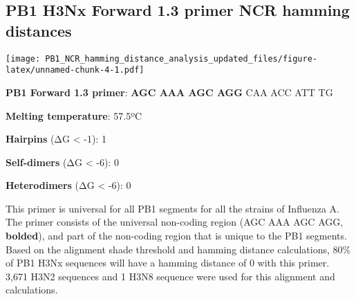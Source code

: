 \documentclass[
]{article}
\newenvironment{Shaded}{\begin{snugshade}}{\end{snugshade}}
\newcommand{\AttributeTok}[1]{\textcolor[rgb]{0.77,0.63,0.00}{#1}}
\newcommand{\DecValTok}[1]{\textcolor[rgb]{0.00,0.00,0.81}{#1}}
\newcommand{\FunctionTok}[1]{\textcolor[rgb]{0.00,0.00,0.00}{#1}}
\newcommand{\NormalTok}[1]{#1}
\newcommand{\OtherTok}[1]{\textcolor[rgb]{0.56,0.35,0.01}{#1}}
\newcommand{\SpecialCharTok}[1]{\textcolor[rgb]{0.00,0.00,0.00}{#1}}
\newcommand{\StringTok}[1]{\textcolor[rgb]{0.31,0.60,0.02}{#1}}
\begin{document}
\hypertarget{pb1-h3nx-forward-1.3-primer-ncr-hamming-distances}{%
\subsection{PB1 H3Nx Forward 1.3 primer NCR hamming
distances}\label{pb1-h3nx-forward-1.3-primer-ncr-hamming-distances}}

\begin{Shaded}
\end{Shaded}

\texttt{[image: PB1\_NCR\_hamming\_distance\_analysis\_updated\_files/figure-latex/unnamed-chunk-4-1.pdf]}

\textbf{PB1 Forward 1.3 primer}: \textbf{AGC AAA AGC AGG} CAA ACC ATT TG

\textbf{Melting temperature}: 57.5ºC

\textbf{Hairpins} (ΔG \textless{} -1): 1

\textbf{Self-dimers} (ΔG \textless{} -6): 0

\textbf{Heterodimers} (ΔG \textless{} -6): 0

This primer is universal for all PB1 segments for all the strains of
Influenza A. The primer consists of the universal non-coding region (AGC
AAA AGC AGG, \textbf{bolded}), and part of the non-coding region that is
unique to the PB1 segments. Based on the alignment shade threshold and
hamming distance calculations, 80\% of PB1 H3Nx sequences will have a
hamming distance of 0 with this primer. 3,671 H3N2 sequences and 1 H3N8
sequence were used for this alignment and calculations.
\end{document}
